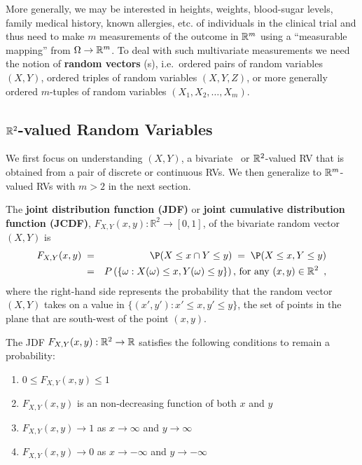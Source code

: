 More generally, we may be interested in heights, weights, blood-sugar levels, family medical history, known allergies, etc. of individuals in the clinical trial and thus need to make $m$ measurements of the outcome in $\mathbb{R}^m$ using a ``measurable mapping'' from $\Omega \to \mathbb{R}^m$.  
To deal with such multivariate measurements we need the notion of {\bf random vectors} ({\rv}s), i.e.~ordered pairs of random variables $(X,Y)$, ordered triples of random variables $(X,Y,Z)$, or more generally ordered $m$-tuples of random variables $(X_1,X_2,\ldots,X_m)$.  

\subsection{$\mathbb{R}^2$-valued Random Variables}

We first focus on understanding $(X,Y)$, a bivariate \rv~or $\mathbb{R}^2$-valued RV that is obtained from a pair of discrete or continuous RVs.  
We then generalize to $\mathbb{R}^m$-valued RVs with $m>2$ in the next section.

\begin{definition}[JDF]\label{Df:JDF}
The {\bf joint distribution function (JDF)} or {\bf joint cumulative distribution function (JCDF)}, $F_{X,Y}(x,y):\mathbb{R}^2\to [0,1]$, of the bivariate random vector $(X,Y)$ is
\begin{eqnarray}\label{E:j2DF}
F_{X,Y}(x,y)\; 
&=& \P(X\leq x \cap Y \leq y) \;= \;\P(X\leq x , Y \leq y)\notag\\
&=& P\left( \{ \omega: X(\omega) \le x, Y(\omega) \le y \} \right) \mbox{, for any } (x,y) \in \mathbb{R}^2 \enspace ,
\end{eqnarray}
where the right-hand side represents the probability that the random vector $(X,Y)$ takes on a value in 
$\{(x',y'): x' \leq x, y' \leq y\}$, the set of points in the plane that are south-west of the point $(x,y)$.
\end{definition}

The JDF $F_{X,Y}(x,y):\mathbb{R}^2\to\mathbb{R}$ satisfies the following conditions to remain a probability: 
\begin{enumerate}
\item $0 \leq F_{X,Y}(x,y) \leq 1$
\item $F_{X,Y}(x,y)$ is an non-decreasing function of both $x$ and $y$
\item $F_{X,Y}(x,y) \to 1$ as $x\to \infty$ and $y\to \infty$
\item $F_{X,Y}(x,y) \to 0$ as $x\to -\infty$ and $y\to -\infty$
\end{enumerate}

